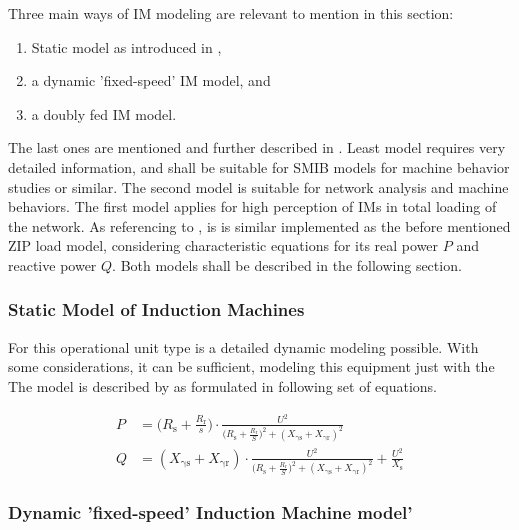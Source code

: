 Three main ways of \acs{IM} modeling are relevant to mention in this section:
\begin{enumerate}
        \item Static model as introduced in \textcite{IEEEGuideLoad2022},
        \item a dynamic 'fixed-speed' \acs{IM} model, and
        \item a doubly fed \acs{IM} model.
\end{enumerate} 
The last ones are mentioned and further described in \textcite{machowskiPowerSystemDynamics2020}. Least model requires very detailed information, and shall be suitable for \acs{SMIB} models for machine behavior studies or similar. The second model is suitable for network analysis and machine behaviors. The first model applies for high perception of \acsp{IM} in total loading of the network. As referencing to \textcite{IEEEGuideLoad2022}, is is similar implemented as the before mentioned ZIP load model, considering characteristic equations for its real power $P$ and reactive power $Q$. Both models shall be described in the following section.

\subsubsection{Static Model of Induction Machines}

For this operational unit type is a detailed dynamic modeling possible. With some considerations, it can be sufficient, modeling this equipment just with the  The model is described by \textcite{IEEEGuideLoad2022} as formulated in following set of equations. %

\begin{align}
        P&=\Bigg( R_\mathrm{s} + \frac{R_\mathrm{r}}{s} \Bigg) \cdot \frac{U^2}{\Big( R_\mathrm{s} + \frac{R_\mathrm{r}}{S} \Big)^2 + (X_\mathrm{\gamma s} + X_\mathrm{\gamma r})^2} \\[12pt]
        Q&=(X_\mathrm{\gamma s} + X_\mathrm{\gamma r}) \cdot \frac{U^2}{\Big( R_\mathrm{s} + \frac{R_\mathrm{r}}{S} \Big)^2 + (X_\mathrm{\gamma s} + X_\mathrm{\gamma r})^2} + \frac{U^2}{X_\mathrm{s}}
\end{align}


\subsubsection{Dynamic 'fixed-speed' Induction Machine model'}

